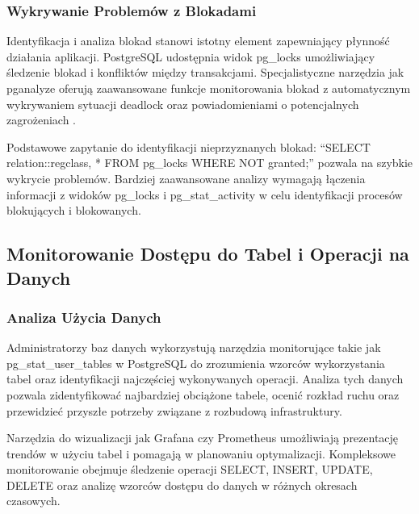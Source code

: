 \documentclass[a4paper,11pt,openany,english]{sphinxmanual}
\begin{document}
\subsubsection{Wykrywanie      Problemów       z       Blokadami}
\label{\detokenize{rozdzial2/Monitorowanie-i-diagnostyka/index:wykrywanie-problemow-z-blokadami}}
\sphinxAtStartPar
Identyfikacja i analiza blokad stanowi istotny element zapewniający płynność działania aplikacji. PostgreSQL udostępnia widok pg\_locks umożliwiający śledzenie blokad i konfliktów między transakcjami. Specjalistyczne narzędzia jak pganalyze oferują zaawansowane funkcje monitorowania blokad z automatycznym wykrywaniem sytuacji deadlock oraz powiadomieniami o potencjalnych zagrożeniach .

\sphinxAtStartPar
Podstawowe zapytanie do identyfikacji nieprzyznanych blokad: “SELECT relation::regclass, * FROM pg\_locks WHERE NOT granted;” pozwala na szybkie wykrycie problemów. Bardziej zaawansowane analizy wymagają łączenia informacji z widoków pg\_locks i pg\_stat\_activity w celu identyfikacji procesów blokujących i blokowanych.


\subsection{Monitorowanie   Dostępu do      Tabel   i       Operacji        na      Danych}
\label{\detokenize{rozdzial2/Monitorowanie-i-diagnostyka/index:monitorowanie-dostepu-do-tabel-i-operacji-na-danych}}

\subsubsection{Analiza Użycia  Danych}
\label{\detokenize{rozdzial2/Monitorowanie-i-diagnostyka/index:analiza-uzycia-danych}}
\sphinxAtStartPar
Administratorzy baz danych wykorzystują narzędzia monitorujące takie jak pg\_stat\_user\_tables w PostgreSQL do zrozumienia wzorców wykorzystania tabel oraz identyfikacji najczęściej wykonywanych operacji. Analiza tych danych pozwala zidentyfikować najbardziej obciążone tabele, ocenić rozkład ruchu oraz przewidzieć przyszłe potrzeby związane z rozbudową infrastruktury.

\sphinxAtStartPar
Narzędzia do wizualizacji jak Grafana czy Prometheus umożliwiają prezentację trendów w użyciu tabel i pomagają w planowaniu optymalizacji. Kompleksowe monitorowanie obejmuje śledzenie operacji SELECT, INSERT, UPDATE, DELETE oraz analizę wzorców dostępu do danych w różnych okresach czasowych.
\end{document}
